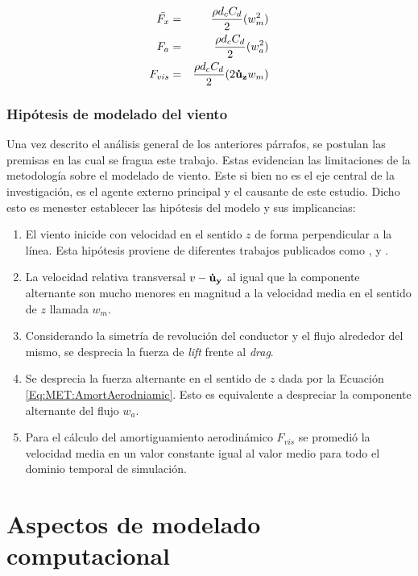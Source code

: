 \begin{eqnarray}
	\bar{F_x} &=&  \frac{\rho d_c C_d}{2} (w_m^2)\\
	F_a &=&  \frac{\rho d_c C_d}{2} (w_a^2)\\
	\label{Eq:MET:AmortAerodniamic}
	F_{vis}  &=& \frac{\rho d_c C_d}{2} (2 \text{$\bf{\dot{u}}_{z}$} w_m)
\end{eqnarray}  


\subsubsection{Hipótesis de modelado del viento} \label{Sec:MET:HipotesisdeTrabajo}
Una vez descrito el análisis general de los anteriores párrafos, se postulan las premisas en las cual se fragua este trabajo. Estas evidencian las limitaciones de la metodología sobre el modelado de viento. Este si bien no es el eje central de la investigación, es el agente externo principal y el causante de este estudio. Dicho esto es menester establecer las hipótesis del modelo y sus implicancias:

\begin{enumerate}
	\item El viento inicide con velocidad en el sentido $z$ de forma perpendicular a la línea. Esta hipótesis proviene de diferentes trabajos publicados como \citep{duranona2009analysis}, \citep{yang2016nonlinear} y \citep{stengel2017measurements}.
	\item La velocidad relativa transversal $v-\bf{\dot{u}}_{y}$ al igual que la componente alternante son mucho menores en magnitud a la velocidad media en el sentido de $z$ llamada $w_m$.
	\item Considerando la simetría de revolución del conductor y el flujo alrededor del mismo, se desprecia la fuerza de \textit{lift} frente al \textit{drag}.
	\item Se desprecia la fuerza alternante en el sentido de $z$ dada por la Ecuación \eqref{Eq:MET:AmortAerodniamic}. Esto es equivalente a despreciar la componente alternante del flujo $w_a$.
	\item Para el cálculo del amortiguamiento aerodinámico $F_{vis}$ se promedió la velocidad media en un valor constante igual al valor medio para todo el dominio temporal de simulación.
\end{enumerate}

\section{Aspectos de modelado computacional}\label{Sec:MET:ModeladoComput}
